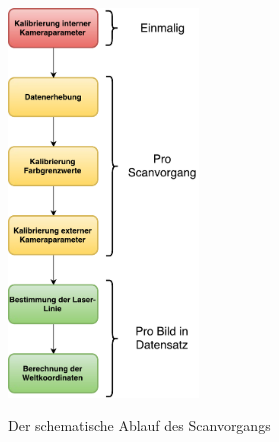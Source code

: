\begin{figure}
\centering 
\includegraphics[width=0.45\textwidth]{images/ScannerVerfahren.pdf}
\label{fig:scanVorgang}
\caption{Der schematische Ablauf des Scanvorgangs}
\end{figure}
\leavevmode

